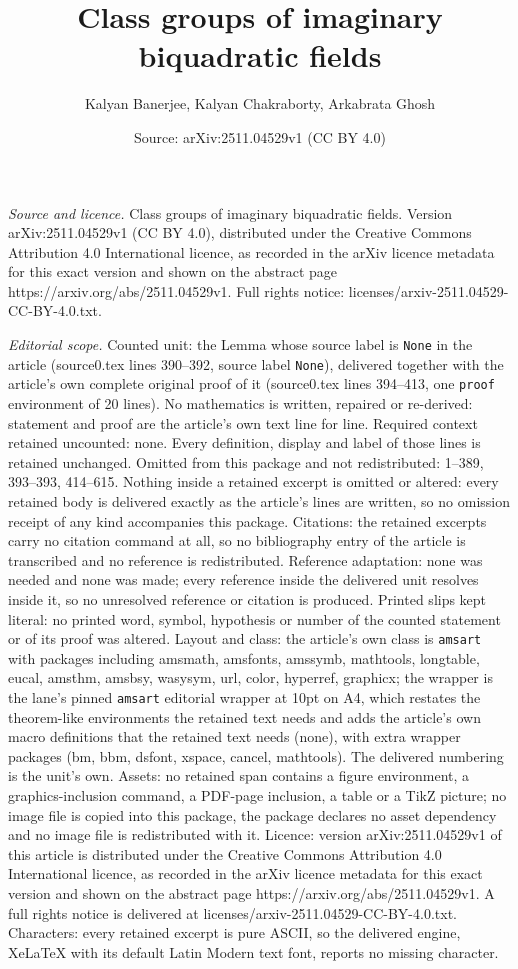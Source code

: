 \documentclass[10pt,a4paper]{amsart}
\title[Class groups of imaginary biquadratic fields]{Class groups of imaginary biquadratic fields}
\author{Kalyan Banerjee, Kalyan Chakraborty, Arkabrata Ghosh}
\date{Source: arXiv:2511.04529v1 (CC BY 4.0)}
\begin{document}
\maketitle

\noindent\emph{Source and licence.} Class groups of imaginary biquadratic fields. Version arXiv:2511.04529v1 (CC BY 4.0), distributed under the Creative Commons Attribution 4.0 International licence, as recorded in the arXiv licence metadata for this exact version and shown on the abstract page https://arxiv.org/abs/2511.04529v1. Full rights notice: licenses/arxiv-2511.04529-CC-BY-4.0.txt.\par\smallskip

\noindent\textit{Editorial scope.} Counted unit: the Lemma whose source label is \texttt{None} in the article (source0.tex lines 390--392, source label \texttt{None}), delivered together with the article's own complete original proof of it (source0.tex lines 394--413, one \texttt{proof} environment of 20 lines). No mathematics is written, repaired or re-derived: statement and proof are the article's own text line for line. Required context retained uncounted: none. Every definition, display and label of those lines is retained unchanged. Omitted from this package and not redistributed: 1--389, 393--393, 414--615. Nothing inside a retained excerpt is omitted or altered: every retained body is delivered exactly as the article's lines are written, so no omission receipt of any kind accompanies this package. Citations: the retained excerpts carry no citation command at all, so no bibliography entry of the article is transcribed and no reference is redistributed. Reference adaptation: none was needed and none was made; every reference inside the delivered unit resolves inside it, so no unresolved reference or citation is produced. Printed slips kept literal: no printed word, symbol, hypothesis or number of the counted statement or of its proof was altered. Layout and class: the article's own class is \texttt{amsart} with packages including amsmath, amsfonts, amssymb, mathtools, longtable, eucal, amsthm, amsbsy, wasysym, url, color, hyperref, graphicx; the wrapper is the lane's pinned \texttt{amsart} editorial wrapper at 10pt on A4, which restates the theorem-like environments the retained text needs and adds the article's own macro definitions that the retained text needs (none), with extra wrapper packages (bm, bbm, dsfont, xspace, cancel, mathtools). The delivered numbering is the unit's own. Assets: no retained span contains a figure environment, a graphics-inclusion command, a PDF-page inclusion, a table or a TikZ picture; no image file is copied into this package, the package declares no asset dependency and no image file is redistributed with it. Licence: version arXiv:2511.04529v1 of this article is distributed under the Creative Commons Attribution 4.0 International licence, as recorded in the arXiv licence metadata for this exact version and shown on the abstract page https://arxiv.org/abs/2511.04529v1. A full rights notice is delivered at licenses/arxiv-2511.04529-CC-BY-4.0.txt. Characters: every retained excerpt is pure ASCII, so the delivered engine, XeLaTeX with its default Latin Modern text font, reports no missing character.
\end{document}
